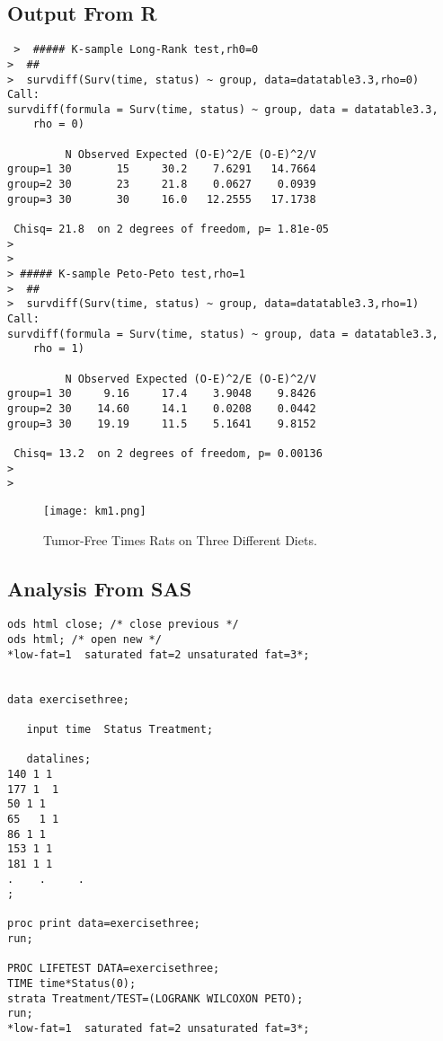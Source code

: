 \documentclass[11pt]{article}
\numberwithin{figure}{section}
\begin{document}
\subsection{Output From R}

\begin{verbatim}
 >  ##### K-sample Long-Rank test,rh0=0
>  ##
>  survdiff(Surv(time, status) ~ group, data=datatable3.3,rho=0)
Call:
survdiff(formula = Surv(time, status) ~ group, data = datatable3.3, 
    rho = 0)

         N Observed Expected (O-E)^2/E (O-E)^2/V
group=1 30       15     30.2    7.6291   14.7664
group=2 30       23     21.8    0.0627    0.0939
group=3 30       30     16.0   12.2555   17.1738

 Chisq= 21.8  on 2 degrees of freedom, p= 1.81e-05 
> 
> 
> ##### K-sample Peto-Peto test,rho=1
>  ##
>  survdiff(Surv(time, status) ~ group, data=datatable3.3,rho=1)
Call:
survdiff(formula = Surv(time, status) ~ group, data = datatable3.3, 
    rho = 1)

         N Observed Expected (O-E)^2/E (O-E)^2/V
group=1 30     9.16     17.4    3.9048    9.8426
group=2 30    14.60     14.1    0.0208    0.0442
group=3 30    19.19     11.5    5.1641    9.8152

 Chisq= 13.2  on 2 degrees of freedom, p= 0.00136 
> 
> 

\end{verbatim}

\begin{figure}[h!]
  \caption{Tumor-Free Times Rats on Three Different Diets.}
  \centering
    \texttt{[image: km1.png]}
\label{fig:awesome_image}
\end{figure}


\subsection{Analysis From SAS}
\begin{verbatim}
ods html close; /* close previous */
ods html; /* open new */
*low-fat=1  saturated fat=2 unsaturated fat=3*;	


data exercisethree;
   
   input time  Status Treatment;

   datalines;
140 1 1
177 1  1
50 1 1
65   1 1
86 1 1
153 1 1
181 1 1
.    .     .
;

proc print data=exercisethree;
run;

PROC LIFETEST DATA=exercisethree;
TIME time*Status(0);
strata Treatment/TEST=(LOGRANK WILCOXON PETO);
run;
*low-fat=1  saturated fat=2 unsaturated fat=3*;

\end{verbatim}
\end{document}
